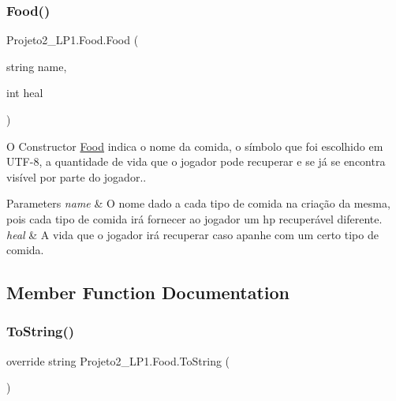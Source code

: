 \subsubsection{\texorpdfstring{Food()}{Food()}}
{\footnotesize\ttfamily Projeto2\+\_\+\+L\+P1.\+Food.\+Food (\begin{DoxyParamCaption}\item[{string}]{name,  }\item[{int}]{heal }\end{DoxyParamCaption})\hspace{0.3cm}{\ttfamily [inline]}}



O Constructor \mbox{\hyperlink{class_projeto2___l_p1_1_1_food}{Food}} indica o nome da comida, o símbolo que foi escolhido em U\+T\+F-\/8, a quantidade de vida que o jogador pode recuperar e se já se encontra visível por parte do jogador.. 


\begin{DoxyParams}{Parameters}
{\em name} & O nome dado a cada tipo de comida na criação da mesma, pois cada tipo de comida irá fornecer ao jogador um hp recuperável diferente.\\
\hline
{\em heal} & A vida que o jogador irá recuperar caso apanhe com um certo tipo de comida.\\
\hline
\end{DoxyParams}


\subsection{Member Function Documentation}
\mbox{\label{class_projeto2___l_p1_1_1_food_a023375f2f12e68f59e99448d020f0a61}} 
\subsubsection{\texorpdfstring{To\+String()}{ToString()}}
{\footnotesize\ttfamily override string Projeto2\+\_\+\+L\+P1.\+Food.\+To\+String (\begin{DoxyParamCaption}{ }\end{DoxyParamCaption})\hspace{0.3cm}{\ttfamily [inline]}}



